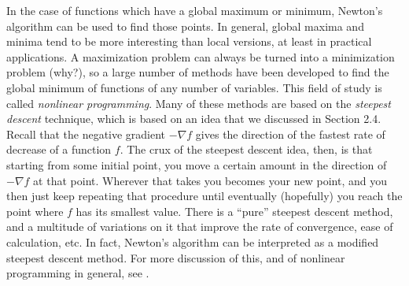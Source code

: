 In the case of functions which have a global maximum or minimum, Newton's algorithm can be used to find those
points. In general, global maxima and minima tend to be more interesting than local versions, at least in practical
applications. A maximization problem can always be turned into a minimization problem (why?), so a large number of
methods have been developed to find the global minimum of functions of any number of variables. This field
of study is called \emph{nonlinear programming}. Many of these methods are based on the \emph{steepest
descent} technique, which is based on an idea that we discussed in Section 2.4. Recall that the negative gradient
$-\nabla f$ gives the direction of the fastest rate of decrease of a function $f$. The crux of the steepest descent
idea, then, is that starting from some initial point, you move a certain amount in the direction of $-\nabla f$ at
that point. Wherever that takes you becomes your new point, and you then just keep repeating that procedure until
eventually (hopefully) you reach the point where $f$ has its smallest value. There is a ``pure'' steepest descent
method, and a multitude of variations on it that improve the rate of convergence, ease of calculation, etc. In fact,
Newton's algorithm can be interpreted as a modified steepest descent method. For more discussion of this, and
of nonlinear programming in general, see \cite{bss}.
\startexercises\label{sec2dot6}
\vspace{1mm}
